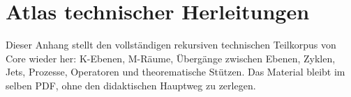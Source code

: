 \section{Atlas technischer Herleitungen}
\label{sec:oc-core-1-3-technical-derivation-atlas}

Dieser Anhang stellt den vollständigen rekursiven technischen Teilkorpus von
Core wieder her: K-Ebenen, M-Räume, Übergänge zwischen Ebenen, Zyklen, Jets,
Prozesse, Operatoren und theorematische Stützen. Das Material bleibt im selben
PDF, ohne den didaktischen Hauptweg zu zerlegen.

\begingroup
\let\ocappendixsection\section
\let\ocappendixsubsection\subsection
\let\ocappendixsubsubsection\subsubsection
\renewcommand{\section}{\ocappendixsubsection}
\renewcommand{\subsection}{\ocappendixsubsubsection}
\scriptsize
\RaggedRight
\sloppy

\endgroup
